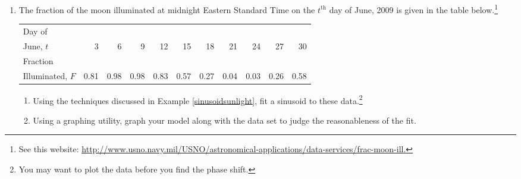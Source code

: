 \begin{enumerate}
\begin{enumerate}
\item  Using a graphing utility, graph your model along with the data set to judge the reasonableness of the fit.

\item Use the model you found in part \ref{LakeErieTempData} to predict the average temperature recorded for Lake Erie on April $15^{\text{th}}$ and September $15^{\text{th}}$ during the years 1971--2000.\footnote{The computed average is $41^{\circ}$F for April $15^{\text{th}}$ and $71^{\circ}$F for September $15^{\text{th}}$.}

\item Compare your results to those obtained using a graphing utility.

\end{enumerate}

\item  The fraction of the moon illuminated at midnight Eastern Standard Time on the $t^{\text{th}}$ day of June, 2009 is given in the table below.\footnote{See this website: \href{http://www.usno.navy.mil/USNO/astronomical-applications/data-services/frac-moon-ill}{\underline{http://www.usno.navy.mil/USNO/astronomical-applications/data-services/frac-moon-ill}.}} 


\medskip

\small

\noindent \begin{tabular}{|l|r|r|r|r|r|r|r|r|r|r|} \hline
Day of  & & & & & & & & & & \\
June, $t$ & 3 & 6 & 9 & 12 & 15 & 18 & 21 & 24 & 27 & 30\\ 
\hline 
Fraction  & & & & & & & & & & \\
Illuminated, $F$ & 0.81 & 0.98 & 0.98 & 0.83 & 0.57 & 0.27 & 0.04 & 0.03 & 0.26 & 0.58  \\ \hline
\end{tabular}

\normalsize

\medskip

\begin{enumerate}

\item \label{MoonIllumination} Using the techniques discussed in Example \ref{sinusoidsunlight}, fit a sinusoid to these data.\footnote{You may want to plot the data before you find the phase shift.} 

\item  Using a graphing utility, graph your model along with the data set to judge the reasonableness of the fit.


\end{enumerate}
\end{enumerate}
